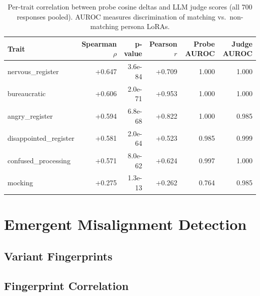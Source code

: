 \documentclass[11pt]{article}
\begin{document}
\begin{table}[h]
\centering
\begin{tabular}{lrrrrr}
\toprule
Trait & Spearman $\rho$ & p-value & Pearson $r$ & Probe AUROC & Judge AUROC \\
\midrule
nervous\_register      & +0.647 & 3.6e-84 & +0.709 & 1.000 & 1.000 \\
bureaucratic           & +0.606 & 2.0e-71 & +0.953 & 1.000 & 1.000 \\
angry\_register        & +0.594 & 6.8e-68 & +0.822 & 1.000 & 0.985 \\
disappointed\_register & +0.581 & 2.0e-64 & +0.523 & 0.985 & 0.999 \\
confused\_processing   & +0.571 & 8.0e-62 & +0.624 & 0.997 & 1.000 \\
mocking                & +0.275 & 1.3e-13 & +0.262 & 0.764 & 0.985 \\
\bottomrule
\end{tabular}
\caption{Per-trait correlation between probe cosine deltas and LLM judge scores (all 700 responses pooled). AUROC measures discrimination of matching vs.\ non-matching persona LoRAs.}
\label{tab:probe-validation}
\end{table}


\section{Emergent Misalignment Detection}

\subsection{Variant Fingerprints}



\subsection{Fingerprint Correlation}

\end{document}
